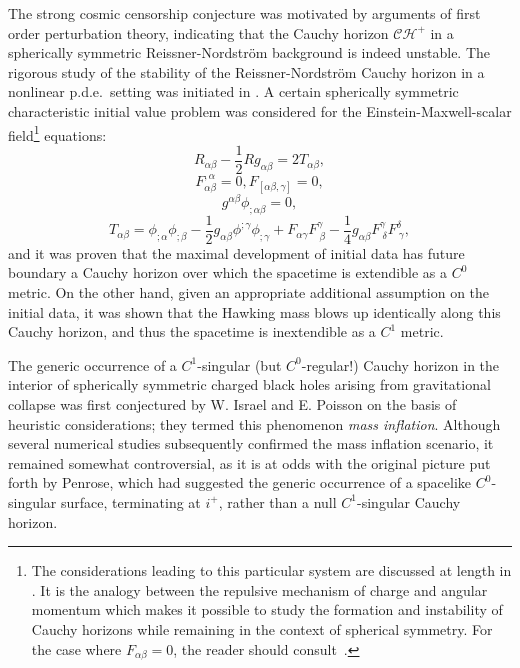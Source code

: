 \documentclass{article}
\begin{document}
The strong cosmic censorship 
conjecture was motivated by arguments of first
order perturbation theory, indicating that the Cauchy
horizon $\mathcal{CH}^+$ in a spherically symmetric Reissner-Nordstr\"om background
is indeed unstable.
The rigorous study of the stability of the Reissner-Nordstr\"om
Cauchy horizon in a nonlinear p.d.e.~setting was initiated
in \cite{md:si}. 
A certain spherically symmetric
characteristic initial value problem
was considered for the
Einstein-Maxwell-scalar field\footnote{The considerations 
leading to this particular system are discussed
at length in \cite{md:si, md:bb, bdim:scsbhi, brsm:bhs}.
It is the analogy between the repulsive
mechanism of charge and angular momentum which
makes it possible to
study the formation and instability of Cauchy
horizons while remaining in
the context of spherical symmetry. For the case where $F_{\alpha\beta}=0$,
the reader should consult~\cite{chr:ins, chr:mt, chr:bv, chr:sgsf}.} 
equations:
\begin{equation}
\label{Einstein-xs}
R_{\alpha\beta}-\frac12Rg_{\alpha\beta}=2T_{\alpha\beta},
\end{equation}
\begin{equation}
\label{Maxwell-xs}
F^{,\alpha}_{\alpha\beta}=0, F_{[\alpha\beta,\gamma]}=0,
\end{equation}
\begin{equation}
\label{wave-xs}
g^{\alpha\beta}\phi_{;\alpha\beta}=0,
\end{equation}
\begin{equation}
\label{em-xs}
T_{\alpha\beta}=\phi_{;\alpha}\phi_{;\beta}
-\frac12g_{\alpha\beta}\phi^{;\gamma}\phi_{;\gamma}
+F_{\alpha\gamma}F^{\gamma}_{\ \beta}-\frac14g_{\alpha\beta}F^{\gamma}_{\ \delta}
F^{\delta}_{\ \gamma},
\end{equation}
and it was proven
that the maximal development of initial data has future boundary
a Cauchy horizon over which the spacetime is extendible
as a $C^0$ metric. On the other hand, given an appropriate
additional assumption on the initial data, it was shown
that the Hawking mass blows up identically along this Cauchy horizon,
and thus the spacetime is inextendible as a $C^1$ metric.

The generic occurrence of a $C^1$-singular (but $C^0$-regular!)
Cauchy horizon in the interior of spherically symmetric charged
black holes arising from gravitational collapse
was first conjectured 
by W. Israel and E. Poisson \cite{ispo:isbh} on the 
basis of heuristic considerations; they termed this phenomenon
\emph{mass inflation}. Although several numerical
\cite{brsm:bhs, lb:sb} studies subsequently 
confirmed the mass inflation scenario,
it remained
somewhat controversial, as it is at odds with
the original picture put forth by Penrose, which had suggested
the generic occurrence
of a spacelike $C^0$-singular surface, terminating at $i^+$, rather than
a null $C^1$-singular Cauchy horizon.
 
\end{document}
